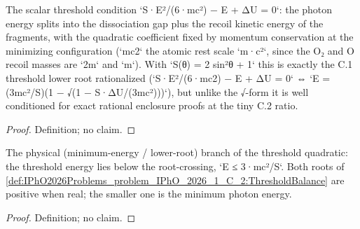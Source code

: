 
\begin{definition}
\label{def:IPhO2026Problems_problem_IPhO_2026_1_C_2:ThresholdBalance}
The scalar threshold condition `S·E²/(6·mc²) − E + ΔU = 0`: the photon
energy splits into the dissociation gap plus the recoil kinetic energy of
the fragments, with the quadratic coefficient fixed by momentum
conservation at the minimizing configuration (`mc2` the atomic rest scale
`m·c²`, since the O₂ and O recoil masses are `2m` and `m`).  With
`S(θ) = 2 sin²θ + 1` this is exactly the C.1 threshold lower root
rationalized (`S·E²/(6·mc2) − E + ΔU = 0` ⇔ `E = (3mc²/S)(1 − √(1 − S·ΔU/(3mc²)))`),
but unlike the √-form it is well conditioned for exact rational enclosure
proofs at the tiny C.2 ratio.
\end{definition}
\begin{proof}
Definition; no claim.
\end{proof}


\begin{definition}
\label{def:IPhO2026Problems_problem_IPhO_2026_1_C_2:LowerRootBranch}
The physical (minimum-energy / lower-root) branch of the threshold
quadratic: the threshold energy lies below the root-crossing,
`E ≤ 3·mc²/S`.  Both roots of
\cref{def:IPhO2026Problems_problem_IPhO_2026_1_C_2:ThresholdBalance} are
positive when real; the smaller one is the minimum photon energy.
\end{definition}
\begin{proof}
Definition; no claim.
\end{proof}

